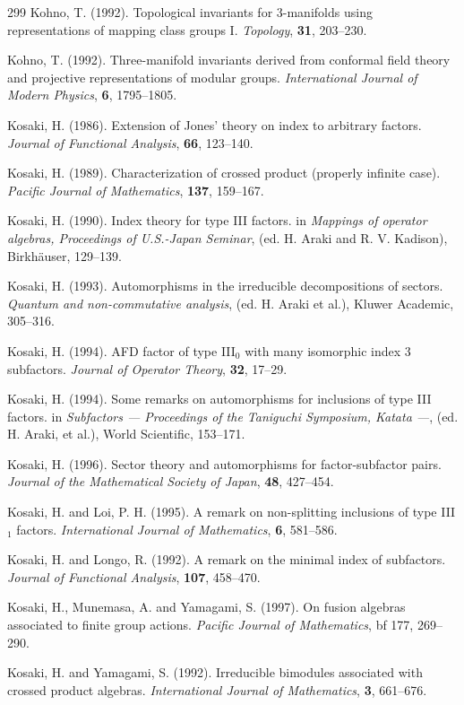 \documentclass[12pt]{article}
\theoremstyle{plain}
\theoremstyle{definition}
\numberwithin{equation}{section}
\begin{document}
\begin{thebibliography} {299}
Kohno, T. (1992).
Topological invariants for $3$-manifolds using
representations of mapping class groups I.
{\em Topology}, {\bf 31}, 203--230.

Kohno, T. (1992).
Three-manifold invariants derived from conformal field theory
and projective representations of modular groups.
{\em International Journal of Modern Physics}, {\bf 6},
1795--1805.

Kosaki, H. (1986).
Extension of Jones' theory on index to arbitrary factors.
{\em Journal of Functional Analysis}, {\bf 66}, 123--140.

Kosaki, H. (1989).
Characterization of crossed product (properly infinite case).
{\em Pacific Journal of Mathematics}, {\bf 137}, 159--167.

Kosaki, H. (1990).
Index theory for type III factors.
in {\em Mappings of operator algebras,
Proceedings of U.S.-Japan Seminar}, (ed. H. Araki and R. V.
Kadison), Birkh\"auser, 129--139.

Kosaki, H. (1993).
Automorphisms in the irreducible decompositions of sectors.
{\em Quantum and non-commutative analysis}, (ed. H. Araki et al.),
Kluwer Academic, 305--316.

Kosaki, H. (1994).
AFD factor of type III$_0$ with many isomorphic
index 3 subfactors.
{\em Journal of Operator Theory}, {\bf 32}, 17--29.

Kosaki, H. (1994).
Some remarks on automorphisms for inclusions of type III factors.
in {\em Subfactors --- Proceedings of the Taniguchi Symposium, Katata ---},
(ed. H. Araki, et al.), World Scientific, 153--171.

Kosaki, H. (1996).
Sector theory and automorphisms for factor-subfactor pairs.
{\em Journal of the Mathematical Society of Japan},
{\bf 48}, 427--454.

Kosaki, H. and Loi, P. H. (1995).
A remark on non-splitting inclusions of type III$_1$
factors.
{\em International Journal of Mathematics}, {\bf 6}, 581--586.

Kosaki, H. and Longo, R. (1992).
A remark on the minimal index of subfactors.
{\em Journal of Functional Analysis}, {\bf 107}, 458--470.

Kosaki, H., Munemasa, A. and Yamagami, S. (1997).
On fusion algebras associated to finite group actions.
{\em Pacific Journal of Mathematics}, {bf 177}, 269--290.

Kosaki, H. and Yamagami, S. (1992).
Irreducible bimodules associated with crossed
product algebras.
{\em International Journal of Mathematics},
{\bf 3}, 661--676.


\end{thebibliography}
\end{document}
